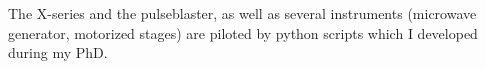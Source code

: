 \documentclass[a4paper, 11pt]{report}
\begin{document}
The X-series and the pulseblaster, as well as several instruments (microwave generator, motorized stages) are piloted by python scripts which I developed during my PhD.
%
%
%
\end{document}
